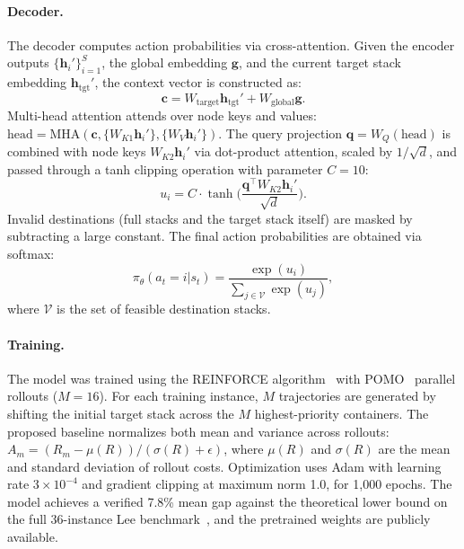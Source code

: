 \paragraph{Decoder.} The decoder computes action probabilities via cross-attention. Given the encoder outputs $\{\mathbf{h}_i'\}_{i=1}^{S}$, the global embedding $\mathbf{g}$, and the current target stack embedding $\mathbf{h}_{\text{tgt}}'$, the context vector is constructed as:
\begin{equation}
    \mathbf{c} = W_{\text{target}} \mathbf{h}_{\text{tgt}}' + W_{\text{global}} \mathbf{g}.
\end{equation}
Multi-head attention attends over node keys and values: $\text{head} = \text{MHA}(\mathbf{c}, \{W_{K1}\mathbf{h}_i'\}, \{W_V\mathbf{h}_i'\})$. The query projection $\mathbf{q} = W_Q(\text{head})$ is combined with node keys $W_{K2}\mathbf{h}_i'$ via dot-product attention, scaled by $1/\sqrt{d}$, and passed through a tanh clipping operation with parameter $C = 10$:
\begin{equation}
    u_i = C \cdot \tanh\!\Big( \frac{\mathbf{q}^\top W_{K2}\mathbf{h}_i'}{\sqrt{d}} \Big).
\end{equation}
Invalid destinations (full stacks and the target stack itself) are masked by subtracting a large constant. The final action probabilities are obtained via softmax:
\begin{equation}
    \pi_\theta(a_t = i | s_t) = \frac{\exp(u_i)}{\sum_{j \in \mathcal{V}} \exp(u_j)},
\end{equation}
where $\mathcal{V}$ is the set of feasible destination stacks.

\paragraph{Training.} The model was trained using the REINFORCE algorithm~\cite{williams1992} with POMO~\cite{kwon2020} parallel rollouts ($M = 16$). For each training instance, $M$ trajectories are generated by shifting the initial target stack across the $M$ highest-priority containers. The proposed baseline normalizes both mean and variance across rollouts: $A_m = (R_m - \mu(R)) / (\sigma(R) + \epsilon)$, where $\mu(R)$ and $\sigma(R)$ are the mean and standard deviation of rollout costs. Optimization uses Adam with learning rate $3 \times 10^{-4}$ and gradient clipping at maximum norm 1.0, for 1,000 epochs. The model achieves a verified 7.8\% mean gap against the theoretical lower bound on the full 36-instance Lee benchmark~\cite{lee2010}, and the pretrained weights are publicly available.

